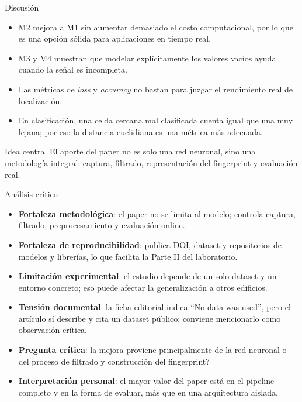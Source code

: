 \documentclass[aspectratio=169]{beamer}
\begin{document}
\begin{frame}{Discusi\'on}
  \begin{itemize}
    \item M2 mejora a M1 sin aumentar demasiado el costo computacional, por lo que es una opci\'on s\'olida para aplicaciones en tiempo real.
    \item M3 y M4 muestran que modelar expl\'icitamente los valores vac\'ios ayuda cuando la se\~nal es incompleta.
    \item Las m\'etricas de \textit{loss} y \textit{accuracy} no bastan para juzgar el rendimiento real de localizaci\'on.
    \item En clasificaci\'on, una celda cercana mal clasificada cuenta igual que una muy lejana; por eso la distancia euclidiana es una m\'etrica m\'as adecuada.
  \end{itemize}
  \vspace{0.2cm}
  \begin{block}{Idea central}
    El aporte del paper no es solo una red neuronal, sino una metodolog\'ia integral: captura, filtrado, representaci\'on del fingerprint y evaluaci\'on real.
  \end{block}
\end{frame}

\begin{frame}{An\'alisis cr\'itico}
  \small
  \begin{itemize}
    \item \textbf{Fortaleza metodol\'ogica}: el paper no se limita al modelo; controla captura, filtrado, preprocesamiento y evaluaci\'on online.
    \item \textbf{Fortaleza de reproducibilidad}: publica DOI, dataset y repositorios de modelos y librer\'ias, lo que facilita la Parte II del laboratorio.
    \item \textbf{Limitaci\'on experimental}: el estudio depende de un solo dataset y un entorno concreto; eso puede afectar la generalizaci\'on a otros edificios.
    \item \textbf{Tensi\'on documental}: la ficha editorial indica ``No data was used'', pero el art\'iculo s\'i describe y cita un dataset p\'ublico; conviene mencionarlo como observaci\'on cr\'itica.
    \item \textbf{Pregunta cr\'itica}: \textquestiondown la mejora proviene principalmente de la red neuronal o del proceso de filtrado y construcci\'on del fingerprint?
    \item \textbf{Interpretaci\'on personal}: el mayor valor del paper est\'a en el pipeline completo y en la forma de evaluar, m\'as que en una arquitectura aislada.
  \end{itemize}
\end{frame}
\end{document}

